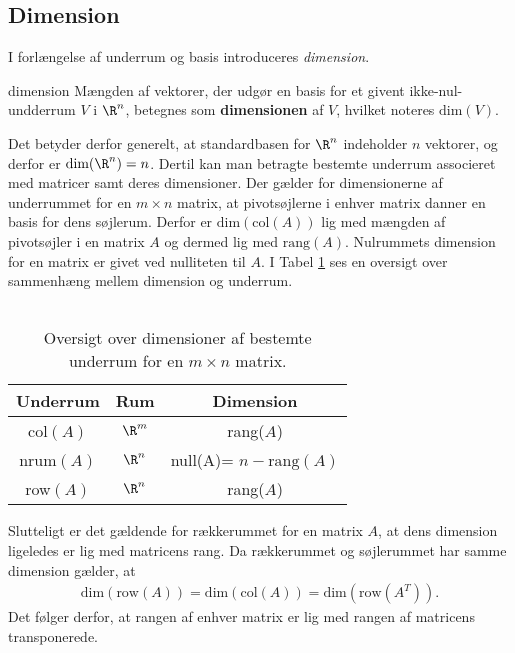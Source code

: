 \subsection{Dimension}
I forlængelse af underrum og basis introduceres \textit{dimension}. 
%
\begin{defn}{}{dimension}
Mængden af vektorer, der udgør en basis for et givent ikke-nul-undderrum $V$ i $\R^n$, betegnes som \textbf{dimensionen} af $V$, hvilket noteres $\text{dim}(V)$. 
\end{defn}
\noindent
%
Det betyder derfor generelt, at standardbasen for $\R^n$ indeholder $n$ vektorer, og derfor er $\text{dim}(\R^n) = n$. 
Dertil kan man betragte bestemte underrum associeret med matricer samt deres dimensioner. 
Der gælder for dimensionerne af underrummet for en $m \times n$ matrix, at pivotsøjlerne i enhver matrix danner en basis for dens søjlerum. 
Derfor er $\text{dim}(\text{col}(A))$ lig med mængden af pivotsøjler i en matrix $A$ og dermed lig med $\text{rang}(A)$. 
Nulrummets dimension for en matrix er givet ved nulliteten til $A$.
I Tabel \ref{dimtab} ses en oversigt over sammenhæng mellem dimension og underrum.
\\\\
%
\begin{table}[h!]
\begin{center}
 \begin{tabular}{||c c c||} 
 \hline
 Underrum & Rum & Dimension\\
 \hline\hline
 col$(A)$ & $\R^m$ & rang($A$)\\ 
 \hline
 nrum$(A)$ & $\R^n$ & null(A)= $n-\text{rang}(A)$\\
 \hline
 row$(A)$ & $\R^n$ & rang($A$)\\
 \hline
\end{tabular}
\caption{Oversigt over dimensioner af bestemte underrum for en $m \times n$ matrix.}
\label{dimtab}
\end{center}
\end{table}
%


%
\noindent
Slutteligt er det gældende for rækkerummet for en matrix $A$, at dens dimension ligeledes er lig med matricens rang. 
Da rækkerummet og søjlerummet har samme dimension gælder, at
%
\begin{align*}
\text{dim}(\text{row}(A))=\text{dim}(\text{col}(A))=\text{dim}(\text{row}(A^T)).
\end{align*}
%
Det følger derfor, at rangen af enhver matrix er lig med rangen af matricens transponerede. 
%